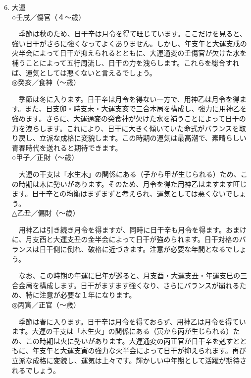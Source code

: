 \documentclass[a5paper,11pt,dvipdfmx]{tarticle}
\begin{document}
\begin{enumerate}
\setcounter{enumi}{5}
\item 大運\\
○壬戌／傷官（４〜歳）
  
　季節は秋のため、日干辛は月令を得て旺じています。ここだけを見ると、強い日干がさらに強くなってよくありません。しかし、年支午と大運支戌の火半会によって日干が抑えられるとともに、大運通変の壬傷官が欠けた水を補うことによって五行周流し、日干の力を洩らします。これらを総合すれば、運気としては悪くないと言えるでしょう。\\

◎癸亥／食神（〜歳）

　季節は冬に入ります。日干辛は月令を得ない一方で、用神乙は月令を得ます。また、日支卯・時支未・大運支亥で三合木局を構成し、強力に用神乙を強めます。さらに、大運通変の癸食神が欠けた水を補うことによって日干の力を洩らします。これにより、日干に大きく傾いていた命式がバランスを取り戻し、立派な成格に変貌します。この時期の運気は最高潮で、素晴らしい青春時代を送れると期待できます。\\

○甲子／正財（〜歳）

　大運の干支は「水生木」の関係にある（子から甲が生じられる）ため、この時期は木に勢いがあります。そのため、月令を得た用神乙はますます旺じます。日干辛との均衡はまずまずと考えられ、運気としては悪くないでしょう。\\

△乙丑／偏財（〜歳）

　用神乙は引き続き月令を得ますが、同時に日干辛も月令を得ます。おまけに、月支酉と大運支丑の金半会によって日干が強められます。日干対格のバランスは日干側に倒れ、破格に近づきます。注意が必要な年間となるでしょう。

　なお、この時期の年運に巳年が巡ると、月支酉・大運支丑・年運支巳の三合金局を構成します。日干がますます強くなり、さらにバランスが崩れるため、特に注意が必要な１年になります。\\

◎丙寅／正官（〜歳）

　季節は春に入ります。日干辛は月令を得ておらず、用神乙は月令を得ています。大運の干支は「木生火」の関係にある（寅から丙が生じられる）ため、この時期は火に勢いがあります。大運通変の丙正官が日干辛を剋すとともに、年支午と大運支寅の強力な火半会によって日干が抑えられます。再び立派な成格に変貌し、運気は上々です。輝かしい中年期として活躍が期待されるでしょう。


\end{enumerate}
\end{document}
